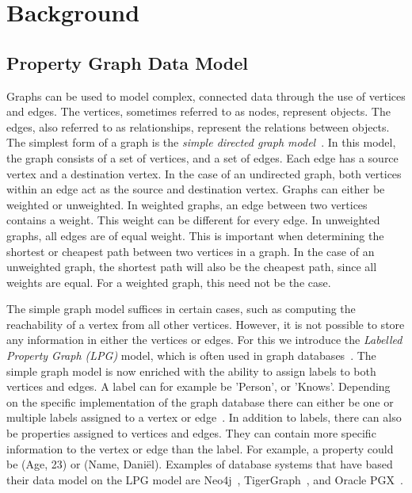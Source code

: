 \section{Background}\label{sec:background}
\subsection{Property Graph Data Model}
Graphs can be used to model complex, connected data through the use of vertices and edges. 
The vertices, sometimes referred to as nodes, represent objects.
The edges, also referred to as relationships, represent the relations between objects. 
The simplest form of a graph is the \textit{simple directed graph model}~\cite{DBLP:journals/corr/abs-1910-09017}. 
In this model, the graph consists of a set of vertices, and a set of edges.
Each edge has a source vertex and a destination vertex. In the case of an undirected graph, both vertices within an edge act as the source and destination vertex. 
Graphs can either be weighted or unweighted. In weighted graphs, an edge between two vertices contains a weight. This weight can be different for every edge. In unweighted graphs, all edges are of equal weight. This is important when determining the shortest or cheapest path between two vertices in a graph. In the case of an unweighted graph, the shortest path will also be the cheapest path, since all weights are equal. For a weighted graph, this need not be the case. 

The simple graph model suffices in certain cases, such as computing the reachability of a vertex from all other vertices. 
However, it is not possible to store any information in either the vertices or edges. 
For this we introduce the \textit{Labelled Property Graph (LPG)} model, which is often used in graph databases~\cite{DBLP:journals/corr/abs-1910-09017}. 
The simple graph model is now enriched with the ability to assign labels to both vertices and edges. 
A label can for example be 'Person', or 'Knows'. 
Depending on the specific implementation of the graph database there can either be one or multiple labels assigned to a vertex or edge~\cite{DBLP:conf/sigmod/AnglesABBFGLPPS18}. 
In addition to labels, there can also be properties assigned to vertices and edges. 
They can contain more specific information to the vertex or edge than the label. 
For example, a property could be (Age, 23) or (Name, Dani\"el).
Examples of database systems that have based their data model on the LPG model are Neo4j~\cite{neo4jgraphbook}, TigerGraph~\cite{tigergraph}, and Oracle PGX~\cite{pgx}.


